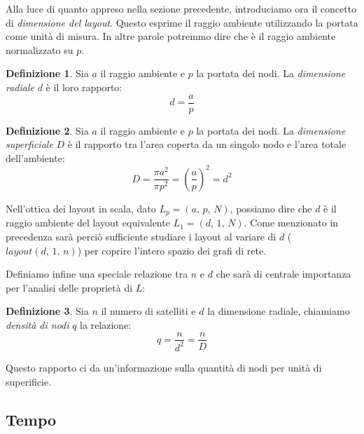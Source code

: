 \documentclass[a4paper,12pt]{article}
\theoremstyle{definition}
\newtheorem{definition}{Definizione}
\begin{document}
Alla luce di quanto appreso nella sezione precedente, introduciamo ora il concetto di \emph{dimensione del layout}. Questo esprime il raggio ambiente utilizzando la portata come unità di misura. In altre parole potremmo dire che è il raggio ambiente normalizzato su $p$.

\begin{definition}
Sia $a$ il raggio ambiente e $p$ la portata dei nodi. La \emph{dimensione radiale} $d$ è il loro rapporto:
\begin{equation*}
d = \frac{a}{p}
\end{equation*}
\end{definition}

\begin{definition}
Sia $a$ il raggio ambiente e $p$ la portata dei nodi. La \emph{dimensione superficiale} $D$ è il rapporto tra l'area coperta da un singolo nodo e l'area totale dell'ambiente:
\begin{equation*}
D = \frac{\pi a^2}{\pi p^2} = \left(\frac{a}{p}\right)^2 = d^2
\end{equation*}
\end{definition}

Nell'ottica dei layout in scala, dato $L_p = (a,\,p,\,N)$, possiamo dire che $d$ è il raggio ambiente del layout equivalente $L_1 = (d,\,1,\,N)$. Come menzionato in precedenza sarà perciò sufficiente studiare i layout al variare di $d$ ($layout(d,\,1,\,n)$) per coprire l'intero spazio dei grafi di rete.


Definiamo infine una speciale relazione tra $n$ e $d$ che sarà di centrale importanza per l'analisi delle proprietà di $L$:

\begin{definition}
Sia $n$ il numero di satelliti e $d$ la dimensione radiale, chiamiamo \emph{densità di nodi} $q$ la relazione:
\begin{equation*}
q = \frac{n}{d^2} = \frac{n}{D}
\end{equation*}
\end{definition}

Questo rapporto ci da un'informazione sulla quantità di nodi per unità di superificie.

\subsection{Tempo}
\end{document}
